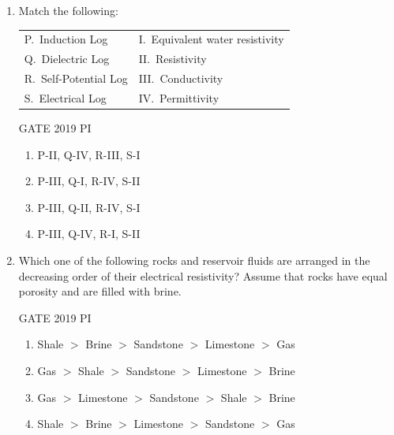 \documentclass[journal,12pt,onecolumn]{IEEEtran}
\theoremstyle{remark}
\begin{document}
\begin{enumerate}
\hfill{GATE 2019 PI}

\begin{multicols}{2}
\begin{enumerate}
    \item Porosity
    \item Relative permeability
    \item Capillary pressure
    \item Wettability
\end{enumerate}
\end{multicols}
\item Match the following:

\begin{tabular}{ll}
P.\ Induction Log         & I.\ Equivalent water resistivity \\
Q.\ Dielectric Log        & II.\ Resistivity \\
R.\ Self-Potential Log    & III.\ Conductivity \\
S.\ Electrical Log        & IV.\ Permittivity \\
\end{tabular}

\hfill{GATE 2019 PI}

\begin{multicols}{2}
\begin{enumerate}
    \item P-II, Q-IV, R-III, S-I
    \item P-III, Q-I, R-IV, S-II
    \item P-III, Q-II, R-IV, S-I
    \item P-III, Q-IV, R-I, S-II
\end{enumerate}
\end{multicols}

\item Which one of the following rocks and reservoir fluids are arranged in the decreasing order of their electrical resistivity? Assume that rocks have equal porosity and are filled with brine.

\hfill{GATE 2019 PI}

\begin{multicols}{2}
\begin{enumerate}
    \item Shale $>$ Brine $>$ Sandstone $>$ Limestone $>$ Gas
    \item Gas $>$ Shale $>$ Sandstone $>$ Limestone $>$ Brine
    \item Gas $>$ Limestone $>$ Sandstone $>$ Shale $>$ Brine
    \item Shale $>$ Brine $>$ Limestone $>$ Sandstone $>$ Gas
\end{enumerate}
\end{multicols}


\end{enumerate}
\end{document}
